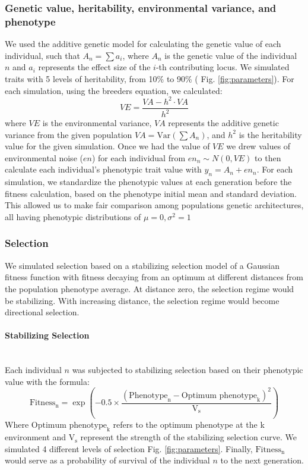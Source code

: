 \documentclass{article}
\let\oldparagraph\paragraph
\renewcommand{\paragraph}[1]{\oldparagraph{#1}\mbox{}\\}
\begin{document}
\subsubsection{Genetic value, heritability, environmental variance, and phenotype}

We used the additive genetic model for calculating the genetic value of each individual, such that $A_n=\sum a_i$, where $A_n$ is the genetic value of the individual $n$ and \( a_i \) represents the effect size of the \( i \)-th contributing locus. We simulated traits with 5 levels of heritability, from 10\% to 90\% ( Fig. \ref{fig:parameters}). For each simulation, using the breeders equation, we calculated:
\[
VE = \frac{VA - h^2 \cdot VA}{h^2}
\]
where \( VE \) is the environmental variance, \( VA \) represents the additive genetic variance from the given population \( VA = \text{Var}\left(\sum A_n\right) \), and \( h^2 \) is the heritability value for the given simulation. Once we had the value of \( VE \) we drew values of environmental noise (\( en \)) for each individual from \( en_n \sim N(0, VE) \) to then calculate each individual's phenotypic trait value with \( y_n = A_n+ en_n \). For each simulation, we standardize the phenotypic values at each generation before the fitness calculation, based on the phenotype initial mean and standard deviation. This allowed us to make fair comparison among populations genetic architectures, all having phenotypic distributions of $\mu = 0, \sigma^2 = 1$

\subsubsection{Selection}
We simulated selection based on a stabilizing selection model of a Gaussian fitness function with fitness decaying from an optimum at different distances from the population phenotype average. At distance zero, the selection regime would be stabilizing. With increasing distance, the selection regime would become directional selection. 

\paragraph{Stabilizing Selection}
Each individual $n$ was subjected to stabilizing selection based on their phenotypic value with the formula:
\[
\text{Fitness}_\text{n} = \exp\left(-0.5 \times \frac{(\text{Phenotype}_\text{n} - {\text{Optimum phenotype}_\text{k}})^2}{\text{V}_\text{s}}\right)
\]
Where $\text{Optimum phenotype}_\text{k}$ refers to the optimum phenotype at the k environment and $\text{V}_\text{s}$ represent the strength of the stabilizing selection curve. We simulated 4 different levels of selection Fig. \ref{fig:parameters}. Finally,  $\text{Fitness}_\text{n}$ would serve as a probability of survival of the individual $n$ to the next generation.
\end{document}
